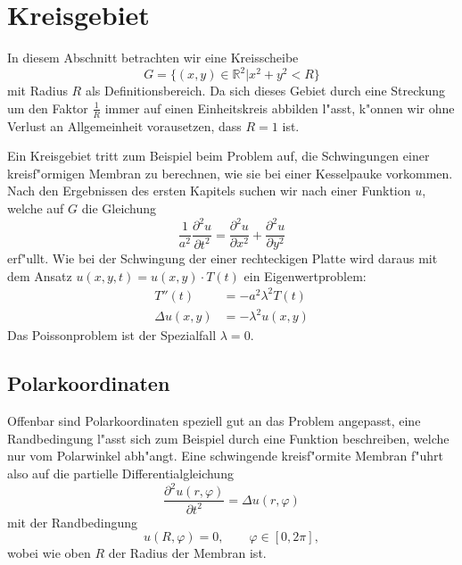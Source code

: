 \section{Kreisgebiet}
In diesem Abschnitt betrachten wir eine Kreisscheibe
\[
G=\{(x,y)\in\mathbb R^2|x^2+y^2 < R\}
\]
mit Radius $R$ als Definitionsbereich. Da sich dieses Gebiet durch
eine Streckung um den Faktor $\frac1R$ immer auf einen Einheitskreis
abbilden l"asst, k"onnen wir ohne Verlust an Allgemeinheit vorausetzen,
dass $R=1$ ist.

Ein Kreisgebiet tritt zum Beispiel beim Problem auf, die Schwingungen
einer kreisf"ormigen Membran zu berechnen, wie sie bei einer Kesselpauke
vorkommen. Nach den Ergebnissen des ersten Kapitels suchen wir nach einer
Funktion $u$, welche auf $G$ die Gleichung
\[
\frac1{a^2}\frac{\partial^2 u}{\partial t^2}=\frac{\partial^2 u}{\partial x^2}+\frac{\partial^2 u}{\partial y^2}
\]
erf"ullt. Wie bei der Schwingung der einer rechteckigen Platte
wird daraus mit dem Ansatz $ u(x,y,t)=u(x,y)\cdot T(t)$ ein
Eigenwertproblem:
\begin{align*}
T''(t)&=-a^2\lambda^2 T(t)\\
\Delta u(x,y)&=-\lambda^2u(x,y)
\end{align*}
Das Poissonproblem ist der Spezialfall $\lambda=0$.

\subsection{Polarkoordinaten}
Offenbar sind Polarkoordinaten speziell gut an das Problem angepasst, 
eine Randbedingung l"asst sich zum Beispiel durch eine Funktion beschreiben,
welche nur vom Polarwinkel abh"angt.
Eine schwingende kreisf"ormite Membran f"uhrt also auf die partielle
Differentialgleichung
\[
\frac{\partial^2u(r,\varphi)}{\partial t^2}=\Delta u(r,\varphi)
\]
mit der Randbedingung
\[
u(R,\varphi)=0,\qquad\varphi\in[0,2\pi],
\]
wobei wie oben $R$ der Radius der Membran ist.

